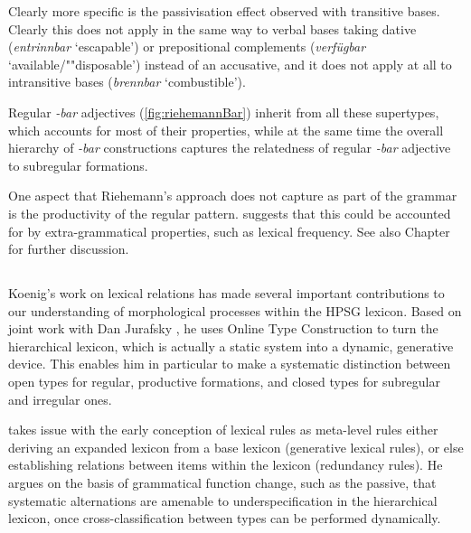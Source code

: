 \documentclass[output=paper
 	        ,biblatex
                ,babelshorthands
                ,newtxmath
                ,draftmode
                ,colorlinks, citecolor=brown
]{langscibook}
\begin{document}
Clearly more specific is the passivisation effect observed with
transitive bases. Clearly this does not apply in the same way to
verbal bases taking dative (\textit{entrinnbar} `escapable') or
prepositional complements (\textit{verfügbar} `available/""disposable')
instead of an accusative, and it does not apply at all to intransitive
bases (\textit{brennbar} `combustible').  

\begin{exe}
  \ex
\end{exe}

Regular \textit{-bar} adjectives (\ref{fig:riehemannBar}) inherit from all these supertypes, which
accounts for most of their properties, while at the same time the overall hierarchy of \textit{-bar} constructions
captures the relatedness of regular \textit{-bar} adjective to subregular formations. 


One aspect that Riehemann's approach does not capture as part of the
grammar is the productivity of the regular
pattern. \citet[]{Riehemann98} suggests that this could be accounted for
by extra-grammatical properties, such as lexical frequency. See also
Chapter~ for further discussion.

\subsection{\citet{Koenig99}}

Koenig's work on lexical relations has made several important
contributions to our understanding of morphological processes within
the HPSG lexicon. Based on joint work with Dan Jurafsky
\citep{Koenig94}, he uses Online Type Construction to turn the
hierarchical lexicon, which is actually a static system into a
dynamic, generative device. This enables him in particular to make a
systematic distinction between open types for regular, productive
formations, and closed types for subregular and irregular ones.

\citet{Koenig99} takes issue with the early conception of lexical
rules as meta-level rules either deriving an expanded lexicon from a
base lexicon (generative lexical rules), or else establishing
relations between items within the lexicon (redundancy rules). He
argues on the basis of grammatical function change, such as the
 passive, that systematic alternations are amenable to
underspecification in the hierarchical lexicon,  once
cross-classification between types can be performed dynamically.
\end{document}
